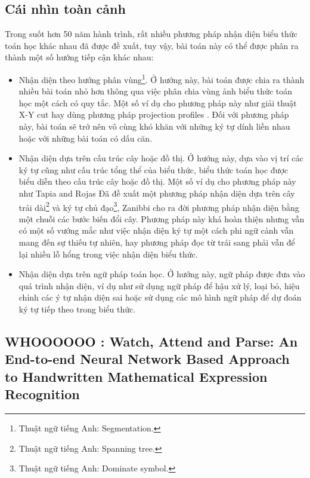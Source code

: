 \documentclass[a4paper,12pt]{article}
\begin{document}
	\subsection{Cái nhìn toàn cảnh}
	
	Trong suốt hơn 50 năm hành trình, rất nhiều phương pháp nhận diện biểu thức toán học khác nhau đã được đề xuất, tuy vậy, bài toán này có thể được phân ra thành một số hướng tiếp cận khác nhau:
	
	\begin{itemize}
		\item Nhận diện theo hướng phân vùng\footnote{Thuật ngữ tiếng Anh: Segmentation.}. Ở hướng này, bài toán được chia ra thành nhiều bài toán nhỏ hơn thông qua việc phân chia vùng ảnh biểu thức toán học một cách có quy tắc. Một số ví dụ cho phương pháp này như giải thuật X-Y cut \cite{XY} hay dùng phương pháp projection profiles \cite{projection}. Đối với phương pháp này, bài toán sẽ trở nên vô cùng khó khăn với những ký tự dính liền nhau hoặc với những bài toán có dấu căn.
		
		\item Nhận diện dựa trên cấu trúc cây hoặc đồ thị. Ở hướng này, dựa vào vị trí các ký tự cũng như cấu trúc tổng thể của biểu thức, biểu thức toán học được biểu diễn theo cấu trúc cây hoặc đồ thị. Một số ví dụ cho phương pháp này như Tapia and Rojas Đã đề xuất một phương pháp nhận diện dựa trên cây trải dài\footnote{Thuật ngữ tiếng Anh: Spanning tree.} và ký tự chủ đạo\footnote{Thuật ngữ tiếng Anh: Dominate symbol.}, Zanibbi cho ra đời phương pháp nhận diện bằng một chuỗi các bước biến đổi cây\cite{zanibbi}. Phương pháp này khá hoàn thiện nhưng vẫn có một số vướng mắc như việc nhận diện ký tự một cách phi ngữ cảnh vẫn mang đến sự thiếu tự nhiên, hay phương pháp đọc từ trái sang phải vẫn để lại nhiều lỗ hổng trong việc nhận diện biểu thức.
		
		\item Nhận diện dựa trên ngữ pháp toán học. Ở hướng này, ngữ pháp được đưa vào quá trình nhận diện, ví dụ như sử dụng ngữ pháp để hậu xử lý, loại bỏ, hiệu chỉnh các ý tự nhận diện sai hoặc sử dụng các mô hình ngữ pháp để dự đoán ký tự tiếp theo trong biểu thức.
	\end{itemize}
	
	
	\subsection{WHOOOOOO  : Watch, Attend and Parse: An End-to-end Neural Network Based Approach to Handwritten Mathematical Expression Recognition} 
	
\end{document}

